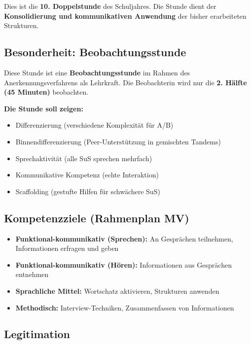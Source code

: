 \documentclass[11pt, a4paper]{article}
\begin{document}
Dies ist die \textbf{10. Doppelstunde} des Schuljahres. Die Stunde dient der \textbf{Konsolidierung und kommunikativen Anwendung} der bisher erarbeiteten Strukturen.

\subsection{Besonderheit: Beobachtungsstunde}

\begin{beobachtungsbox}
Diese Stunde ist eine \textbf{Beobachtungsstunde} im Rahmen des Anerkennungsverfahrens als Lehrkraft. Die Beobachterin wird nur die \textbf{2. Hälfte (45 Minuten)} beobachten.

\textbf{Die Stunde soll zeigen:}
\begin{itemize}[leftmargin=2em, nosep]
    \item[$\checkmark$] Differenzierung (verschiedene Komplexität für A/B)
    \item[$\checkmark$] Binnendifferenzierung (Peer-Unterstützung in gemischten Tandems)
    \item[$\checkmark$] Sprechaktivität (alle SuS sprechen mehrfach)
    \item[$\checkmark$] Kommunikative Kompetenz (echte Interaktion)
    \item[$\checkmark$] Scaffolding (gestufte Hilfen für schwächere SuS)
\end{itemize}
\end{beobachtungsbox}

\subsection{Kompetenzziele (Rahmenplan MV)}

\begin{itemize}[leftmargin=2em]
    \item \textbf{Funktional-kommunikativ (Sprechen):} An Gesprächen teilnehmen, Informationen erfragen und geben
    \item \textbf{Funktional-kommunikativ (Hören):} Informationen aus Gesprächen entnehmen
    \item \textbf{Sprachliche Mittel:} Wortschatz aktivieren, Strukturen anwenden
    \item \textbf{Methodisch:} Interview-Techniken, Zusammenfassen von Informationen
\end{itemize}

\subsection{Legitimation}
\end{document}
